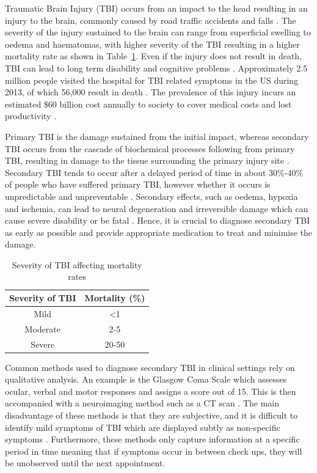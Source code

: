 Traumatic Brain Injury (TBI) occurs from an impact to the head resulting in an injury to the brain, commonly caused by road traffic accidents and falls \cite{Langlois2006}. The severity of the injury sustained to the brain can range from superficial swelling to oedema and haematomas, with higher severity of the TBI resulting in a higher mortality rate as shown in Table~\ref{table:severity of TBI}. Even if the injury does not result in death, TBI can lead to long term disability and cognitive problems \cite{WorldHealthOrganisation2006}. Approximately 2.5 million people visited the hospital for TBI related symptoms in the US during 2013, of which 56,000 result in death \cite{Taylor2017}. The prevalence of this injury incurs an estimated \$60 billion cost annually to society to cover medical costs and lost productivity \cite{Finkelstein2009}. 

Primary TBI is the damage sustained from the initial impact, whereas secondary TBI occurs from the cascade of biochemical processes following from primary TBI, resulting in damage to the tissue surrounding the primary injury site \cite{Norton2008}. Secondary TBI tends to occur after a delayed period of time in about 30\%-40\% of people who have suffered primary TBI, however whether it occurs is unpredictable and unpreventable \cite{Pagkalos2017}. Secondary effects, such as oedema, hypoxia and ischemia, can lead to neural degeneration and irreversible damage which can cause severe disability or be fatal \cite{Murthy2005}. Hence, it is crucial to diagnose secondary TBI as early as possible and provide appropriate medication to treat and minimise the damage.

\begin{table}[H]
\centering
\begin{tabular}{||c c||} 
 \hline
 Severity of TBI & Mortality (\%) \\ [0.5ex] 
 \hline\hline
 Mild & \textless 1 \\ 
 Moderate & 2-5 \\
 Severe & 20-50 \\
 \hline
\end{tabular}
\caption{Severity of TBI affecting mortality rates \cite{WorldHealthOrganisation2006}}
\label{table:severity of TBI}
\end{table}

Common methods used to diagnose secondary TBI in clinical settings rely on qualitative analysis. An example is the Glasgow Coma Scale which assesses ocular, verbal and motor responses and assigns a score out of 15. This is then accompanied with a neuroimaging method such as a CT scan \cite{WorldHealthOrganisation2006}. The main disadvantage of these methods is that they are subjective, and it is difficult to identify mild symptoms of TBI which are displayed subtly as non-specific symptoms \cite{Bettermann2012}. Furthermore, these methods only capture information at a specific period in time meaning that if symptoms occur in between check ups, they will be unobserved until the next appointment. 


